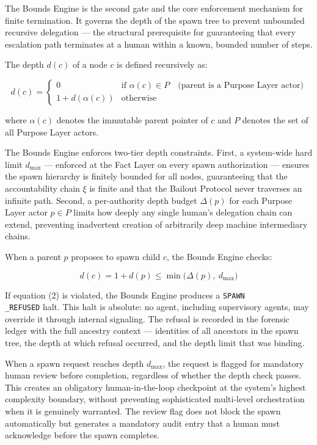 The Bounds Engine is the second gate and the core enforcement mechanism for finite termination. It governs the depth of the spawn tree to prevent unbounded recursive delegation — the structural prerequisite for guaranteeing that every escalation path terminates at a human within a known, bounded number of steps.

The depth $d(c)$ of a node $c$ is defined recursively as:

\begin{equation}
d(c) =
\begin{cases}
0 & \text{if } \alpha(c) \in P \quad \text{(parent is a Purpose Layer actor)} \\
1 + d(\alpha(c)) & \text{otherwise}
\end{cases}
\tag{1}
\end{equation}

where $\alpha(c)$ denotes the immutable parent pointer of $c$ and $P$ denotes the set of all Purpose Layer actors.

The Bounds Engine enforces two-tier depth constraints. First, a system-wide hard limit $d_{\max}$ — enforced at the Fact Layer on every spawn authorization — ensures the spawn hierarchy is finitely bounded for all nodes, guaranteeing that the accountability chain $\xi$ is finite and that the Bailout Protocol never traverses an infinite path. Second, a per-authority depth budget $\Delta(p)$ for each Purpose Layer actor $p \in P$ limits how deeply any single human's delegation chain can extend, preventing inadvertent creation of arbitrarily deep machine intermediary chains.

When a parent $p$ proposes to spawn child $c$, the Bounds Engine checks:

\begin{equation}
d(c) = 1 + d(p) \leq \min\bigl(\Delta(p),\ d_{\max}\bigr)
\tag{2}
\end{equation}

If equation (2) is violated, the Bounds Engine produces a \texttt{SPAWN\\_REFUSED} halt. This halt is absolute: no agent, including supervisory agents, may override it through internal signaling. The refusal is recorded in the forensic ledger with the full ancestry context — identities of all ancestors in the spawn tree, the depth at which refusal occurred, and the depth limit that was binding.

When a spawn request reaches depth $d_{\max}$, the request is flagged for mandatory human review before completion, regardless of whether the depth check passes. This creates an obligatory human-in-the-loop checkpoint at the system's highest complexity boundary, without preventing sophisticated multi-level orchestration when it is genuinely warranted. The review flag does not block the spawn automatically but generates a mandatory audit entry that a human must acknowledge before the spawn completes.

